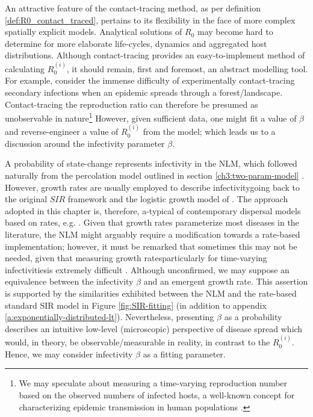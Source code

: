 An attractive feature of the contact-tracing method, as per definition \ref{def:R0_contact_traced}, 
pertains to its flexibility in the face of more complex spatially explicit models.
Analytical solutions of $R_0$ may become hard to determine for more elaborate life-cycles, dynamics and aggregated host distributions.
Although contact-tracing provides an easy-to-implement method of calculating $R_0^{(i)}$, it should remain, first and foremost, an abstract modelling tool.
For example, consider the immense difficulty of experimentally contact-tracing secondary infections when an epidemic spreads through a forest/landscape.
Contact-tracing the reproduction ratio can therefore be presumed as unobservable in nature\footnote{
We may speculate about measuring a time-varying reproduction number based on the observed numbers of infected hosts,
a well-known concept for characterizing epidemic transmission in human populations \cite{thompson2019improved}.}
However, given sufficient data, one might fit a value of $\beta$ and reverse-engineer a value of $R_0^{(i)}$ from the model;
which leads us to a discussion around the infectivity parameter $\beta$.

A probability of state-change represents infectivity in the NLM, which followed naturally from the percolation model outlined in section \ref{ch3:two-param-model} \cite{OROZCOFUENTES201912}.
However, growth rates are usually employed to describe infectivity\textemdash going back to the original $SIR$ framework \cite{kermack-model} and the logistic growth model of \cite{van2013plant}.
The approach adopted in this chapter is, therefore, a-typical of contemporary dispersal models based on rates, e.g. \cite{fabre2021optimising, control-theory, white2017modelling, large-scale-control}.
Given that growth rates parameterize most diseases in the literature, the NLM might arguably require a modification towards a rate-based implementation;
however, it must be remarked that sometimes this may not be needed, given that measuring growth rates\textemdash particularly for time-varying infectivities\textemdash is extremely difficult \cite{13-challenges}.
Although unconfirmed, we may suppose an equivalence between the infectivity $\beta$ and an emergent growth rate. This assertion is supported by the similarities exhibited between the NLM and the rate-based standard SIR model in Figure \ref{fig:SIR-fitting} (in addition to appendix \ref{a:exponentially-distributed-lt}).
Nevertheless, presenting $\beta$ as a probability describes an intuitive low-level (microscopic) perspective of disease spread which would, 
in theory, be observable/measurable in reality, in contrast to the $R_0^{(i)}$.
Hence, we may consider infectivity $\beta$ as a fitting parameter.


\newpage
